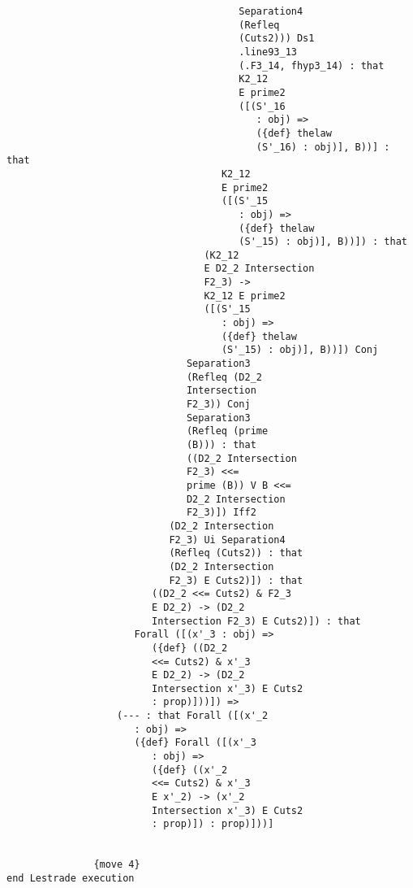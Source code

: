 \documentclass[12pt]{article}
\begin{document}
\begin{verbatim}
                                        Separation4 
                                        (Refleq 
                                        (Cuts2))) Ds1 
                                        .line93_13 
                                        (.F3_14, fhyp3_14) : that 
                                        K2_12 
                                        E prime2 
                                        ([(S'_16 
                                           : obj) => 
                                           ({def} thelaw 
                                           (S'_16) : obj)], B))] : that 
                                     K2_12 
                                     E prime2 
                                     ([(S'_15 
                                        : obj) => 
                                        ({def} thelaw 
                                        (S'_15) : obj)], B))]) : that 
                                  (K2_12 
                                  E D2_2 Intersection 
                                  F2_3) -> 
                                  K2_12 E prime2 
                                  ([(S'_15 
                                     : obj) => 
                                     ({def} thelaw 
                                     (S'_15) : obj)], B))]) Conj 
                               Separation3 
                               (Refleq (D2_2 
                               Intersection 
                               F2_3)) Conj 
                               Separation3 
                               (Refleq (prime 
                               (B))) : that 
                               ((D2_2 Intersection 
                               F2_3) <<= 
                               prime (B)) V B <<= 
                               D2_2 Intersection 
                               F2_3)]) Iff2 
                            (D2_2 Intersection 
                            F2_3) Ui Separation4 
                            (Refleq (Cuts2)) : that 
                            (D2_2 Intersection 
                            F2_3) E Cuts2)]) : that 
                         ((D2_2 <<= Cuts2) & F2_3 
                         E D2_2) -> (D2_2 
                         Intersection F2_3) E Cuts2)]) : that 
                      Forall ([(x'_3 : obj) => 
                         ({def} ((D2_2 
                         <<= Cuts2) & x'_3 
                         E D2_2) -> (D2_2 
                         Intersection x'_3) E Cuts2 
                         : prop)]))]) => 
                   (--- : that Forall ([(x'_2 
                      : obj) => 
                      ({def} Forall ([(x'_3 
                         : obj) => 
                         ({def} ((x'_2 
                         <<= Cuts2) & x'_3 
                         E x'_2) -> (x'_2 
                         Intersection x'_3) E Cuts2 
                         : prop)]) : prop)]))]


               {move 4}
end Lestrade execution
\end{verbatim}
\end{document}
